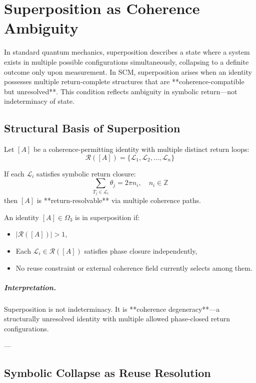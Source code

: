 \chapter{Superposition as Coherence Ambiguity} \label{chapter:superposition}

In standard quantum mechanics, superposition describes a state where a system exists in multiple possible configurations simultaneously, collapsing to a definite outcome only upon measurement. In SCM, superposition arises when an identity possesses multiple return-complete structures that are **coherence-compatible but unresolved**. This condition reflects ambiguity in symbolic return—not indeterminacy of state.

\section{Structural Basis of Superposition}

Let $[A]$ be a coherence-permitting identity with multiple distinct return loops:
\[
\mathcal{R}([A]) = \{\mathcal{L}_1, \mathcal{L}_2, \dots, \mathcal{L}_n\}
\]

If each $\mathcal{L}_i$ satisfies symbolic return closure:
\[
\sum_{T_j \in \mathcal{L}_i} \theta_j = 2\pi n_i,\quad n_i \in \mathbb{Z}
\]
then $[A]$ is **return-resolvable** via multiple coherence paths.

\begin{definition}
An identity $[A] \in \Omega_3$ is in superposition if:
\begin{itemize}
  \item $|\mathcal{R}([A])| > 1$,
  \item Each $\mathcal{L}_i \in \mathcal{R}([A])$ satisfies phase closure independently,
  \item No reuse constraint or external coherence field currently selects among them.
\end{itemize}
\end{definition}

\paragraph{Interpretation.}  
Superposition is not indeterminacy. It is **coherence degeneracy**—a structurally unresolved identity with multiple allowed phase-closed return configurations.

---

\section{Symbolic Collapse as Reuse Resolution}

